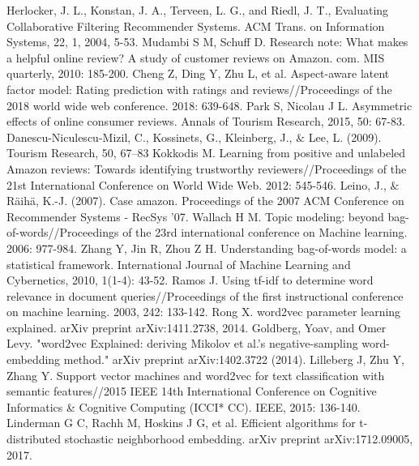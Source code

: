 \documentclass[12pt]{article}%
\begin{document}
	
\newpage
\setmainfont{Times New Roman}
\fancyhf{}
\nocite{*}		
\begin{thebibliography}{9}
	Herlocker, J. L., Konstan, J. A., Terveen, L. G., and Riedl, J. T., Evaluating Collaborative Filtering Recommender Systems. ACM Trans. on Information Systems, 22, 1, 2004, 5-53.
	Mudambi S M, Schuff D. Research note: What makes a helpful online review? A study of customer reviews on Amazon. com. MIS quarterly, 2010: 185-200.
	Cheng Z, Ding Y, Zhu L, et al. Aspect-aware latent factor model: Rating prediction with ratings and reviews//Proceedings of the 2018 world wide web conference. 2018: 639-648.
	Park S, Nicolau J L. Asymmetric effects of online consumer reviews. Annals of Tourism Research, 2015, 50: 67-83.
	 Danescu-Niculescu-Mizil, C., Kossinets, G., Kleinberg, J., $\&$ Lee, L. (2009).
	Tourism Research, 50, 67–83
	 Kokkodis M. Learning from positive and unlabeled Amazon reviews: Towards identifying trustworthy reviewers//Proceedings of the 21st International Conference on World Wide Web. 2012: 545-546.
	Leino, J., $\&$ Räihä, K.-J. (2007). Case amazon. Proceedings of the 2007 ACM Conference on Recommender Systems - RecSys ’07.
	Wallach H M. Topic modeling: beyond bag-of-words//Proceedings of the 23rd international conference on Machine learning. 2006: 977-984.
	Zhang Y, Jin R, Zhou Z H. Understanding bag-of-words model: a statistical framework. International Journal of Machine Learning and Cybernetics, 2010, 1(1-4): 43-52.
	Ramos J. Using tf-idf to determine word relevance in document queries//Proceedings of the first instructional conference on machine learning. 2003, 242: 133-142.
	Rong X. word2vec parameter learning explained. arXiv preprint arXiv:1411.2738, 2014.
	Goldberg, Yoav, and Omer Levy. "word2vec Explained: deriving Mikolov et al.'s negative-sampling word-embedding method." arXiv preprint arXiv:1402.3722 (2014).
	Lilleberg J, Zhu Y, Zhang Y. Support vector machines and word2vec for text classification with semantic features//2015 IEEE 14th International Conference on Cognitive Informatics \& Cognitive Computing (ICCI* CC). IEEE, 2015: 136-140.
	Linderman G C, Rachh M, Hoskins J G, et al. Efficient algorithms for t-distributed stochastic neighborhood embedding. arXiv preprint arXiv:1712.09005, 2017.

\end{thebibliography}
\end{document}
